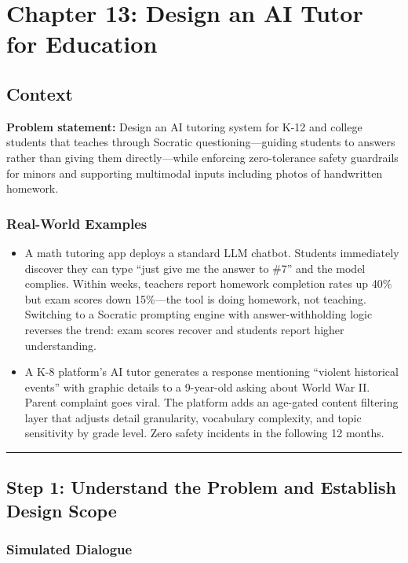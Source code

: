 \chapter{Chapter 13: Design an AI Tutor for Education}

\section*{Context}

\textbf{Problem statement:} Design an AI tutoring system for K-12 and college students that teaches through Socratic questioning---guiding students to answers rather than giving them directly---while enforcing zero-tolerance safety guardrails for minors and supporting multimodal inputs including photos of handwritten homework.

\subsection*{Real-World Examples}

\begin{itemize}
  \item A math tutoring app deploys a standard LLM chatbot. Students immediately discover they can type ``just give me the answer to \#7'' and the model complies. Within weeks, teachers report homework completion rates up 40\% but exam scores down 15\%---the tool is doing homework, not teaching. Switching to a Socratic prompting engine with answer-withholding logic reverses the trend: exam scores recover and students report higher understanding.
  \item A K-8 platform's AI tutor generates a response mentioning ``violent historical events'' with graphic details to a 9-year-old asking about World War II. Parent complaint goes viral. The platform adds an age-gated content filtering layer that adjusts detail granularity, vocabulary complexity, and topic sensitivity by grade level. Zero safety incidents in the following 12 months.
\end{itemize}

\bigskip\hrule\bigskip

\section*{Step 1: Understand the Problem and Establish Design Scope}

\subsection*{Simulated Dialogue}

